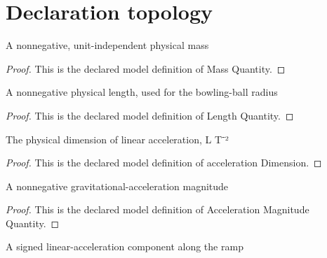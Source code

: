 \section{Declaration topology}
\begin{definition}
  \label{def:physics:phyx-mini-0825:phyxminiproblems-problemphyxmini0825-massquantity}
  A nonnegative, unit-independent physical mass
\end{definition}
\begin{proof}
  This is the declared model definition of Mass Quantity.
\end{proof}
\begin{definition}
  \label{def:physics:phyx-mini-0825:phyxminiproblems-problemphyxmini0825-lengthquantity}
  A nonnegative physical length, used for the bowling-ball radius
\end{definition}
\begin{proof}
  This is the declared model definition of Length Quantity.
\end{proof}
\begin{definition}
  \label{def:physics:phyx-mini-0825:phyxminiproblems-problemphyxmini0825-accelerationdimension}
  The physical dimension of linear acceleration, L T⁻²
\end{definition}
\begin{proof}
  This is the declared model definition of acceleration Dimension.
\end{proof}
\begin{definition}
  \label{def:physics:phyx-mini-0825:phyxminiproblems-problemphyxmini0825-accelerationmagnitudequantity}
  A nonnegative gravitational-acceleration magnitude
\end{definition}
\begin{proof}
  This is the declared model definition of Acceleration Magnitude Quantity.
\end{proof}
\begin{definition}
  \label{def:physics:phyx-mini-0825:phyxminiproblems-problemphyxmini0825-signedaccelerationquantity}
  A signed linear-acceleration component along the ramp
\end{definition}

